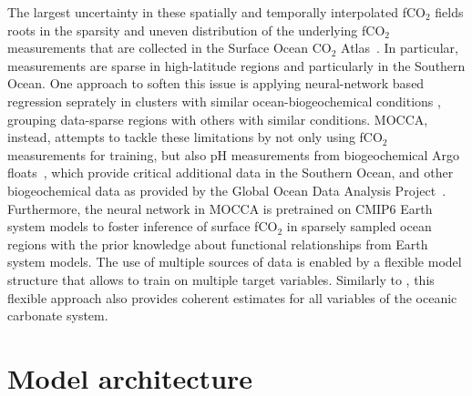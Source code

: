 \documentclass{article}
\begin{document}
	The largest uncertainty in these spatially and temporally interpolated fCO$_2$ fields roots in the sparsity and uneven distribution of the underlying fCO$_2$ measurements that are collected in the Surface Ocean CO$_2$ Atlas~\citep{bakker2016}. In particular, measurements are sparse in high-latitude regions and particularly in the Southern Ocean. One approach to soften this issue is applying neural-network based regression seprately in clusters with similar ocean-biogeochemical conditions \citep{landschuetzer2016,gregor2021}, grouping data-sparse regions with others with similar conditions. MOCCA, instead, attempts to tackle these limitations by not only using fCO$_2$ measurements for training, but also pH measurements from biogeochemical Argo floats~\citep{johnson2017}, which provide critical additional data in the Southern Ocean, and other biogeochemical data as provided by the Global Ocean Data Analysis Project~\citep[GLODAPv2;][]{olsen2016}. Furthermore, the neural network in MOCCA is pretrained on CMIP6 Earth system models to foster inference of surface fCO$_2$ in sparsely sampled ocean regions with the prior knowledge about functional relationships from Earth system models. The use of multiple sources of data is enabled by a flexible model structure that allows to train on multiple target variables. Similarly to \cite{iida2021}, this flexible approach also provides coherent estimates for all variables of the oceanic carbonate system.
	
	\section{Model architecture}
\end{document}
